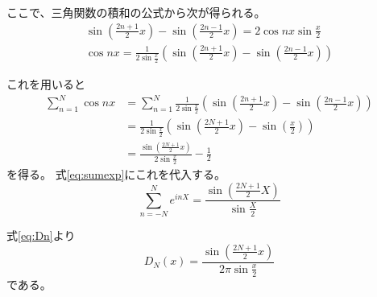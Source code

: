 \documentclass[12pt,b5paper]{ltjsarticle}
\begin{document}
\begin{enumerate}
      ここで、三角関数の積和の公式から次が得られる。
      \begin{gather}
       \sin\left( \frac{2n+1}{2}x \right) - \sin\left( \frac{2n-1}{2}x \right)
        = 2\cos{nx}\sin{\frac{x}{2}}\\
       \cos{nx} = \frac{1}{2\sin{\frac{x}{2}}} \left( \sin\left( \frac{2n+1}{2}x \right) - \sin\left( \frac{2n-1}{2}x \right) \right)
      \end{gather}

      これを用いると
      \begin{align}
       \sum_{n=1}^{N}\cos{nx}
        &= \sum_{n=1}^{N} \frac{1}{2\sin{\frac{x}{2}}} \left( \sin\left( \frac{2n+1}{2}x \right) - \sin\left( \frac{2n-1}{2}x \right) \right)\\
        &= \frac{1}{2\sin{\frac{x}{2}}} \left( \sin\left( \frac{2N+1}{2}x \right) - \sin\left( \frac{x}{2} \right) \right)\\
       &= \frac{\sin\left( \frac{2N+1}{2}x \right)}{2\sin{\frac{x}{2}}} - \frac{1}{2}
      \end{align}
      を得る。
      式\eqref{eq:sumexp}にこれを代入する。
      \begin{equation}
       \sum_{n=-N}^{N} e^{inX}
        = \frac{\sin\left( \frac{2N+1}{2}X \right)}{\sin{\frac{X}{2}}}
      \end{equation}

      式\eqref{eq:Dn}より
      \begin{equation}
       D_{N}(x) = \frac{\sin\left( \frac{2N+1}{2}x \right)}{2\pi \sin{\frac{x}{2}}}
      \end{equation}
      である。



      \hrulefill

\end{enumerate}

\hrulefill
\end{document}
